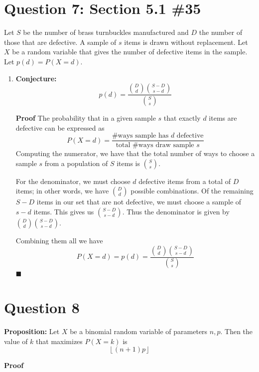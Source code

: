 \documentclass[11pt, oneside]{article}   	%
\newcommand*{\QEDA}{\hfill\ensuremath{\blacksquare}}         %
\begin{document}
\section*{Question 7: Section 5.1 \#35}

Let $S$ be the number of brass turnbuckles manufactured and $D$ the number of those that are defective. A sample of $s$ items is drawn without replacement. Let $X$ be a random variable that gives the number of defective items in the sample. Let $p(d) = P(X = d)$.
\begin{enumerate}[\quad (a)]
	\item \textbf{Conjecture:}
	$$p(d) = \frac{{D \choose d}{S-D \choose s-d}}{{S \choose s}}$$
	
	\textbf{Proof}
	The probability that in a given sample $s$ that exactly $d$ items are defective can be expressed as
		$$P(X=d) = \frac{\text{\# ways sample has $d$ defective}}{\text{total \# ways draw sample $s$}}$$
	Computing the numerator, we have that the total number of ways to choose a sample $s$ from a population of $S$ items is ${S \choose s}$.
	
	For the denominator, we must choose $d$ defective items from a total of $D$ items; in other words, we have ${D \choose d}$ possible combinations. Of the remaining $S-D$ items in our set that are not defective, we must choose a sample of $s-d$ items. This gives us ${S-D \choose s-d}$. Thus the denominator is given by ${D \choose d}{S-D \choose s-d}$.
	
	Combining them all we have
		$$P(X=d) = p(d) = \frac{{D \choose d}{S-D \choose s-d}}{{S \choose s}}$$
	\QEDA
\end{enumerate}



\section*{Question 8}

\textbf{Proposition:} Let $X$ be a binomial random variable of parameters $n,p$. Then the value of $k$ that maximizes $P(X=k)$ is
$$\left \lfloor{(n+1)p}\right \rfloor $$

\textbf{Proof}
\end{document}
